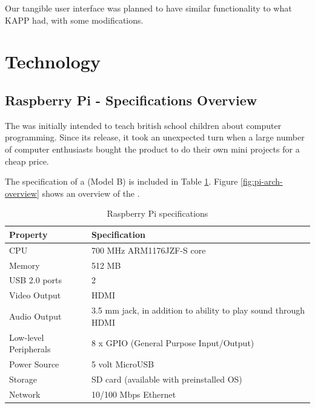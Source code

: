 Our tangible user interface was planned to have similar functionality to what KAPP had, with some modifications. 
 
\section{Technology}
\label{sec:technology}

\subsection{Raspberry Pi - Specifications Overview}
The \rpi{} was initially intended to teach british school children about computer programming\cite{rasperrypi-about}. Since its release, it took an unexpected turn when a large number of computer enthusiasts bought the product to do their own mini projects for a cheap price. 

The specification of a \rpi{} (Model B) is included in Table \ref{tab:pi-specs}. Figure \ref{fig:pi-arch-overview} shows an overview of the \rpi{}.        

\begin{table}[H]
\centering
\begin{tabular}{|p{6.0cm} | p{6.0cm} |}
\hline 
\textbf{Property} & \textbf{Specification} \\
\hline
CPU & 700 MHz ARM1176JZF-S core \\
\hline
Memory & 512 MB \\
\hline
USB 2.0 ports & 2 \\
\hline
Video Output & HDMI \\
\hline
Audio Output & 3.5 mm jack, in addition to ability to play sound through HDMI \\
\hline
Low-level Peripherals & 8 x GPIO (General Purpose Input/Output) \\
\hline
Power Source & 5 volt MicroUSB \\
\hline
Storage & SD card (available with preinstalled OS) \\
\hline
Network & 10/100 Mbps Ethernet  \\
\hline
\end{tabular}
\caption{Raspberry Pi specifications}
\label{tab:pi-specs}
\end{table}

